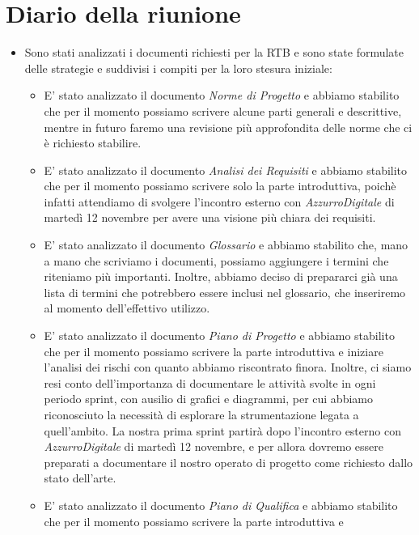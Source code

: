 

\section{Diario della riunione}

\begin{itemize}
    \item Sono stati analizzati i documenti richiesti per la RTB e sono state formulate delle strategie e suddivisi i compiti per la loro stesura iniziale:
    \begin{itemize}
        \item E' stato analizzato il documento \emph{Norme di Progetto} e abbiamo stabilito che per il momento possiamo scrivere alcune parti generali 
        e descrittive, mentre in futuro faremo una revisione più approfondita delle norme che ci è richiesto stabilire.
        \item E' stato analizzato il documento \emph{Analisi dei Requisiti} e abbiamo stabilito che per il momento possiamo scrivere solo la parte introduttiva,
        poichè infatti attendiamo di svolgere l'incontro esterno con \emph{AzzurroDigitale} di martedì 12 novembre per avere una visione più chiara dei requisiti.
        \item E' stato analizzato il documento \emph{Glossario} e abbiamo stabilito che, mano a mano che scriviamo i documenti, possiamo aggiungere i termini
        che riteniamo più importanti. Inoltre, abbiamo deciso di prepararci già una lista di termini che potrebbero essere inclusi nel glossario, che inseriremo
        al momento dell'effettivo utilizzo.
        \item E' stato analizzato il documento \emph{Piano di Progetto} e abbiamo stabilito che per il momento possiamo scrivere la parte introduttiva e iniziare
        l'analisi dei rischi con quanto abbiamo riscontrato finora. Inoltre, ci siamo resi conto dell'importanza di documentare le attività svolte in ogni
        periodo sprint, con ausilio di grafici e diagrammi, per cui abbiamo riconosciuto la necessità di esplorare la strumentazione legata a quell'ambito.
        La nostra prima sprint partirà dopo l'incontro esterno con \emph{AzzurroDigitale} di martedì 12 novembre, e per allora dovremo essere preparati a
        documentare il nostro operato di progetto come richiesto dallo stato dell'arte.
        \item E' stato analizzato il documento \emph{Piano di Qualifica} e abbiamo stabilito che per il momento possiamo scrivere la parte introduttiva e

\end{itemize}
\end{itemize}
